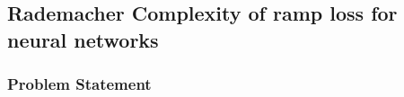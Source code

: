 \newpage
\subsection{Rademacher Complexity of ramp loss for neural networks}
\subsubsection{Problem Statement}